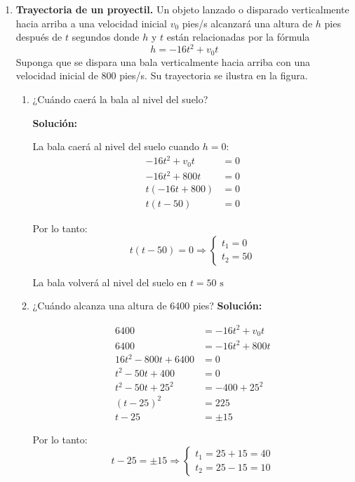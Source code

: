 \documentclass[12pt]{article}
\newcommand{\solucion}{%
    \vspace{0.8em}%
    \textbf{Solución:}%
}
\begin{document}
\begin{enumerate}[label=\alph*.-]
\item \textbf{Trayectoria de un proyectil.} Un objeto lanzado o disparado verticalmente hacia arriba a una velocidad inicial $v_0$ pies/s alcanzará una altura de $h$ pies después de $t$ segundos donde $h$ y $t$ están relacionadas por la fórmula
\[h = -16t^2 + v_0 t\]
Suponga que se dispara una bala verticalmente hacia arriba con una velocidad inicial de 800 pies/s. Su trayectoria se ilustra en la figura.

\begin{enumerate}[label=\roman*)]
\item ¿Cuándo caerá la bala al nivel del suelo?

\solucion

La bala caerá al nivel del suelo cuando $h = 0$:
\begin{align*}
-16t^2 + v_0t &= 0 \\[0.3em]
-16t^2 + 800t &= 0 \\[0.3em]
t(-16t + 800) &= 0 \\[0.3em]
t(t - 50) &= 0
\end{align*}

Por lo tanto:
\[
t(t - 50) = 0 \Rightarrow \begin{cases} t_1 = 0 \\ t_2 = 50 \end{cases}
\]

La bala volverá al nivel del suelo en $\boxed{t = 50 \text{ s}}$

\item ¿Cuándo alcanza una altura de 6400 pies?
\solucion
\begin{align*}
6400 &= -16t^2 + v_0t \\[0.3em]
6400 &= -16t^2 + 800t \\[0.3em]
16t^2 - 800t + 6400 &= 0 \\[0.3em]
t^2 - 50t + 400 &= 0 \\[0.3em]
t^2 - 50t + 25^2 &= -400 + 25^2 \\[0.3em]
(t - 25)^2 &= 225 \\[0.3em]
t - 25 &= \pm 15
\end{align*}

Por lo tanto:
\[
t - 25 = \pm 15 \Rightarrow \begin{cases} t_1 = 25 + 15 = 40 \\ t_2 = 25 - 15 = 10 \end{cases}
\]


\end{enumerate}
\end{enumerate}
\end{document}
